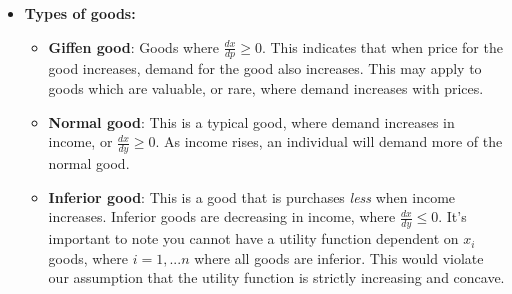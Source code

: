 \documentclass{article}
\begin{document}
\begin{itemize}
    \item \textbf{Types of goods:}
    \begin{itemize}
        \item \textbf{Giffen good}: Goods where $\frac{dx}{dp} \geq 0$. This indicates that when price for the good increases, demand for the good also increases. This may apply to goods which are valuable, or rare, where demand increases with prices. 
        \item \textbf{Normal good}: This is a typical good, where demand increases in income, or $\frac{dx}{dy} \geq 0$. As income rises, an individual will demand more of the normal good. 
        \item \textbf{Inferior good}: This is a good that is purchases \textit{less} when income increases. Inferior goods are decreasing in income, where $\frac{dx}{dy} \leq 0$. It's important to note you cannot have a utility function dependent on $x_i$ goods, where $i = 1,...n$ where all goods are inferior. This would violate our assumption that the utility function is strictly increasing and concave. 
    \end{itemize}
\end{itemize}
\end{document}
